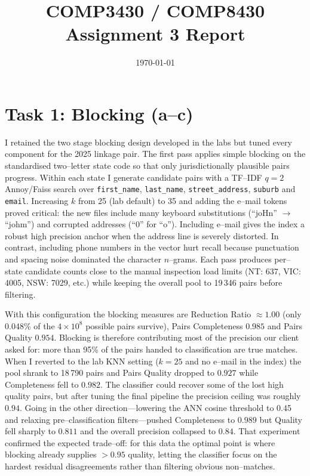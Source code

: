 \documentclass[11pt]{article}
\title{COMP3430 / COMP8430 Assignment 3 Report}
\date{\today}
\begin{document}
\maketitle

\section*{Task 1: Blocking (a--c)}
I retained the two stage blocking design developed in the labs but tuned every component for the 2025 linkage pair. The first pass applies simple blocking on the standardised two--letter state code so that only jurisdictionally plausible pairs progress. Within each state I generate candidate pairs with a TF--IDF $q{=}2$ Annoy/Faiss search over \texttt{first\_name}, \texttt{last\_name}, \texttt{street\_address}, \texttt{suburb} and \texttt{email}. Increasing $k$ from 25 (lab default) to 35 and adding the e--mail tokens proved critical: the new files include many keyboard substitutions (``joHn'' $\rightarrow$ ``johm'') and corrupted addresses (``0'' for ``o''). Including e--mail gives the index a robust high precision anchor when the address line is severely distorted. In contrast, including phone numbers in the vector hurt recall because punctuation and spacing noise dominated the character $n$--grams. Each pass produces per--state candidate counts close to the manual inspection load limits (NT: 637, VIC: 4005, NSW: 7029, etc.) while keeping the overall pool to 19\,346 pairs before filtering.

With this configuration the blocking measures are Reduction Ratio $\approx 1.00$ (only 0.048\% of the $4\times10^8$ possible pairs survive), Pairs Completeness $0.985$ and Pairs Quality $0.954$. Blocking is therefore contributing most of the precision our client asked for: more than 95\% of the pairs handed to classification are true matches. When I reverted to the lab KNN setting ($k{=}25$ and no e--mail in the index) the pool shrank to 18\,790 pairs and Pairs Quality dropped to $0.927$ while Completeness fell to $0.982$. The classifier could recover some of the lost high quality pairs, but after tuning the final pipeline the precision ceiling was roughly $0.94$. Going in the other direction---lowering the ANN cosine threshold to 0.45 and relaxing pre--classification filters---pushed Completeness to $0.989$ but Quality fell sharply to $0.811$ and the overall precision collapsed to $0.84$. That experiment confirmed the expected trade--off: for this data the optimal point is where blocking already supplies $>0.95$ quality, letting the classifier focus on the hardest residual disagreements rather than filtering obvious non--matches.
\end{document}
